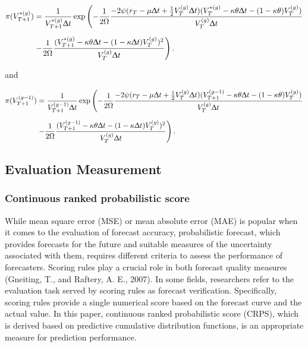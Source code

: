 \documentclass[12pt,a4paper]{article}
\numberwithin{equation}{section}
\begin{document}
\begin{align*}
\pi(V_{T+1}^{*(g)}) &= \frac{1}{V_{T+1}^{*(g)} \Updelta t} \exp \left( - \frac{1}{2 \Omega} \frac{-2 \psi (r_T - \mu \Updelta t + \frac{1}{2}V_{T}^{(g)} \Updelta t)(V_T^{*(g)} - \kappa \theta \Updelta t - (1-\kappa \theta)V_{T}^{(g)})}{V_{T}^{(g)} \Updelta t} \right. \\[0.6em]
& \left. -\frac{1}{2 \Omega} \frac{(V_{T+1}^{*(g)} - \kappa \theta \Updelta t - (1-\kappa\Updelta t)V_{T}^{(g)})^2}{V_{T}^{(g)}\Updelta t}\right).
\end{align*}

and 

\begin{align*}
\pi(V_{T+1}^{(g-1)}) &= \frac{1}{V_{T+1}^{(g-1)} \Updelta t} \exp \left( - \frac{1}{2 \Omega} \frac{-2 \psi (r_{T} - \mu \Updelta t + \frac{1}{2}V_{T}^{(g)} \Updelta t)(V_{T+1}^{(g-1)} - \kappa \theta \Updelta t - (1-\kappa \theta)V_{T}^{(g)})}{V_{T}^{(g)} \Updelta t} \right. \\[0.6em]
& \left. -\frac{1}{2 \Omega} \frac{(V_{T+1}^{(g-1)} - \kappa \theta \Updelta t - (1-\kappa\Updelta t)V_{T}^{(g)})^2}{V_{T}^{(g)}\Updelta t}\right).
\end{align*}

\subsection{Evaluation Measurement}

\subsubsection{Continuous ranked probabilistic score}

While mean square error (MSE) or mean absolute error (MAE) is popular when it comes to the evaluation of forecast accuracy, probabilistic forecast, which provides forecasts for the future and suitable measures of the uncertainty associated with them, requires different criteria to assess the performance of forecasters. Scoring rules play a crucial role in both forecast quality measures (Gneiting, T., and Raftery, A. E., 2007). In some fields, researchers refer to the evaluation task served by scoring rules as forecast verification. Specifically, scoring rules provide a single numerical score based on the forecast curve and the actual value. In this paper, continuous ranked probabilistic score (CRPS), which is derived based on predictive cumulative distribution functions, is an appropriate measure for prediction performance.
\end{document}
